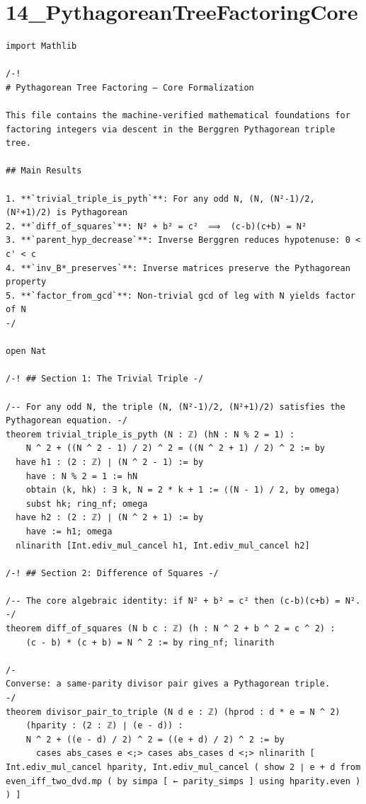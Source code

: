 \documentclass[11pt,openany]{book}
\theoremstyle{definition}
\theoremstyle{plain}
\theoremstyle{remark}
\begin{document}
\clearpage

\section*{14\_PythagoreanTreeFactoringCore}

\begin{lstlisting}[style=lean]
import Mathlib

/-!
# Pythagorean Tree Factoring — Core Formalization

This file contains the machine-verified mathematical foundations for
factoring integers via descent in the Berggren Pythagorean triple tree.

## Main Results

1. **`trivial_triple_is_pyth`**: For any odd N, (N, (N²-1)/2, (N²+1)/2) is Pythagorean
2. **`diff_of_squares`**: N² + b² = c²  ⟹  (c-b)(c+b) = N²
3. **`parent_hyp_decrease`**: Inverse Berggren reduces hypotenuse: 0 < c' < c
4. **`inv_B*_preserves`**: Inverse matrices preserve the Pythagorean property
5. **`factor_from_gcd`**: Non-trivial gcd of leg with N yields factor of N
-/

open Nat

/-! ## Section 1: The Trivial Triple -/

/-- For any odd N, the triple (N, (N²-1)/2, (N²+1)/2) satisfies the Pythagorean equation. -/
theorem trivial_triple_is_pyth (N : ℤ) (hN : N % 2 = 1) :
    N ^ 2 + ((N ^ 2 - 1) / 2) ^ 2 = ((N ^ 2 + 1) / 2) ^ 2 := by
  have h1 : (2 : ℤ) ∣ (N ^ 2 - 1) := by
    have : N % 2 = 1 := hN
    obtain ⟨k, hk⟩ : ∃ k, N = 2 * k + 1 := ⟨(N - 1) / 2, by omega⟩
    subst hk; ring_nf; omega
  have h2 : (2 : ℤ) ∣ (N ^ 2 + 1) := by
    have := h1; omega
  nlinarith [Int.ediv_mul_cancel h1, Int.ediv_mul_cancel h2]

/-! ## Section 2: Difference of Squares -/

/-- The core algebraic identity: if N² + b² = c² then (c-b)(c+b) = N². -/
theorem diff_of_squares (N b c : ℤ) (h : N ^ 2 + b ^ 2 = c ^ 2) :
    (c - b) * (c + b) = N ^ 2 := by ring_nf; linarith

/-
Converse: a same-parity divisor pair gives a Pythagorean triple.
-/
theorem divisor_pair_to_triple (N d e : ℤ) (hprod : d * e = N ^ 2)
    (hparity : (2 : ℤ) ∣ (e - d)) :
    N ^ 2 + ((e - d) / 2) ^ 2 = ((e + d) / 2) ^ 2 := by
      cases abs_cases e <;> cases abs_cases d <;> nlinarith [ Int.ediv_mul_cancel hparity, Int.ediv_mul_cancel ( show 2 ∣ e + d from even_iff_two_dvd.mp ( by simpa [ ← parity_simps ] using hparity.even ) ) ]


\end{lstlisting}
\end{document}

